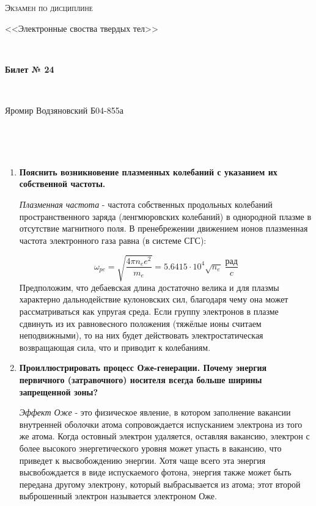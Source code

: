 \documentclass[a4paper]{article}
\begin{document}
\graphicspath{ {pictures/} }
\begin{center}
    {\scshape\Large Экзамен по дисциплине \par <<Электронные своства твердых тел>>} \par

    \

    {\huge\bfseries Билет № 24} \par 

    \

    {\large Яромир Водзяновский Б04-855а}
\end{center}

\

\

\begin{enumerate}
    \item \textbf{Пояснить возникновение плазменных колебаний с указанием их собственной частоты.} \par 
    \textit{Плазменная частота} - частота собственных продольных колебаний пространственного заряда (ленгмюровских колебаний) в однородной плазме в отсутствие магнитного поля. В пренебрежении движением ионов плазменная частота электронного газа равна (в системе СГС): \par 
    $$\omega_{pe} = \sqrt{\frac{4 \pi n_e e^2}{m_e}} = 5.6415 \cdot 10^4 \sqrt{n_e} \; \frac{рад}{c}$$
    Предположим, что дебаевская длина достаточно велика и для плазмы характерно дальнодействие кулоновских сил, благодаря чему она может рассматриваться как упругая среда. Если группу электронов в плазме сдвинуть из их равновесного положения (тяжёлые ионы считаем неподвижными), 
    то на них будет действовать электростатическая возвращающая сила, что и приводит к колебаниям.

    \item \textbf{Проиллюстрировать процесс Оже-генерации. Почему энергия первичного (затравочного) носителя всегда больше ширины запрещенной зоны? } \par 
    \textit{Эффект Оже} - это физическое явление, в котором заполнение вакансии внутренней оболочки атома сопровождается испусканием электрона из того же атома. 
    Когда остовный электрон удаляется, оставляя вакансию, электрон с более высокого энергетического уровня может упасть в вакансию, что приведет к высвобождению энергии. 
    Хотя чаще всего эта энергия высвобождается в виде испускаемого фотона, энергия также может быть передана другому электрону, который выбрасывается из атома; 
    этот второй выброшенный электрон называется электроном Оже.


\end{enumerate}
\end{document}
